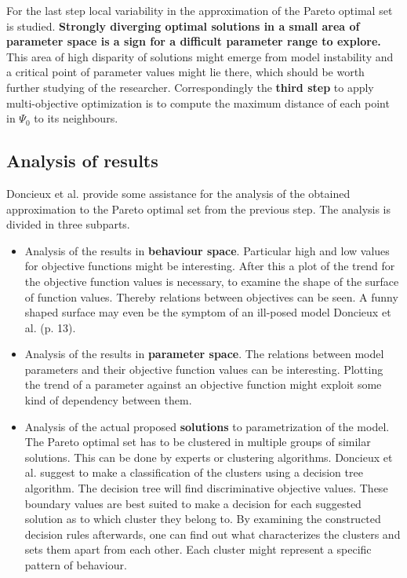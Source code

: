 \documentclass[12pt,twoside]{article}
\theoremstyle{plain}
\theoremstyle{definition}
\theoremstyle{remark}
\begin{document}
For the last step local variability in the approximation of the Pareto optimal set is studied. \textbf{Strongly diverging optimal solutions in a small area of parameter space is a sign for a difficult parameter range to explore.}
This area of high disparity of solutions might emerge from model instability and a critical point of parameter values might lie there, which should be worth further studying of the researcher.
Correspondingly the \textbf{third step} to apply multi-objective optimization is to compute the maximum distance of each point in $\Psi_0$ to its neighbours.
\subsection{Analysis of results}
Doncieux et al. provide some assistance for the analysis of the obtained approximation to the Pareto optimal set from the previous step. The analysis is divided in three subparts.
\begin{itemize}
	\item Analysis of the results in \textbf{behaviour space}. Particular high and low values for objective functions might be interesting. After this a plot of the trend for the objective function values is necessary, to examine the shape of the surface of function values. Thereby relations between objectives can be seen. A funny shaped surface \glqq may even be the symptom of an ill-posed model\grqq{} Doncieux et al. \cite{doncieux2015multi} (p. 13).
	\item Analysis of the results in \textbf{parameter space}. The relations between model parameters and their objective function values can be interesting. Plotting the trend of a parameter against an objective function might exploit some kind of dependency between them.
	\item Analysis of the actual proposed \textbf{solutions} to parametrization of the model. The Pareto optimal set has to be clustered in multiple groups of similar solutions. This can be done by experts or clustering algorithms.
	Doncieux et al. suggest to make a classification of the clusters using a decision tree algorithm. The decision tree will find discriminative objective values. These boundary values are best suited to make a decision for each suggested solution as to which cluster they belong to.
	By examining the constructed decision rules afterwards, one can find out what characterizes the clusters and sets them apart from each other. Each cluster might represent a specific pattern of behaviour.
\end{itemize}
\end{document}
